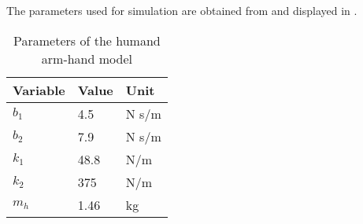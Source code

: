 The parameters used for simulation are obtained from \cite{speich2005modeling} and displayed in .

\begin{table}[H]
\centering
\begin{tabular}{| l | l | l |}
	\hline			
	Variable &	Value &	Unit\\
	\hline
	$b_1$ &	4.5	&	N s/m\\
	\hline
	$b_2$ &	7.9 &	N s/m\\
	\hline
	$k_1$ &	48.8 &	N/m \\
	\hline
	$k_2$ &	375	&	N/m \\
	\hline
	$m_h$ &	1.46 &	kg \\
	\hline  
\end{tabular}
\caption{Parameters of the humand arm-hand model}
\label{fig:human_parameters}
\end{table}